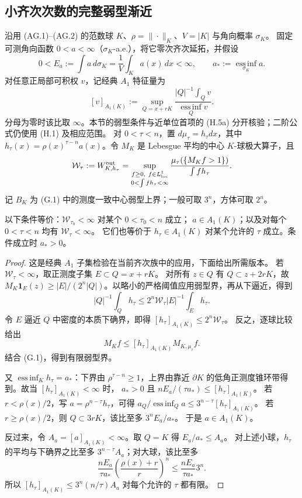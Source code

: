 \subsection{小齐次次数的完整弱型渐近}\label{subsec:small-homogeneity-weak}

沿用 (AG.1)--(AG.2) 的范数球 $K$、$\rho=\|\cdot\|_K$、$V=|K|$ 与角向概率 $\sigma_K$。
固定可测角向函数 $0<a<\infty$（$\sigma_K$-a.e.），将它零次齐次延拓，并假设
\[
0<E_a:=\int a\,d\sigma_K=\frac1V\int_Ka(x)\,dx<\infty,
\qquad a_*:=\operatorname*{ess\,inf}_{\sigma_K}a.
\]
对任意正局部可积权 $v$，记经典 $A_1$ 特征量\cite{Muckenhoupt1972}为
\[
[v]_{A_1(K)}:=\sup_{Q=x+rK}
\frac{|Q|^{-1}\int_Qv}{\operatorname*{ess\,inf}_Qv}. \tag{SA.1}
\]
分母为零时该比取 $\infty$。本节的弱型条件与近单位首项的 (H.5a) 分开核验；二阶公式仍使用 (H.1) 及相应范围。
对 $0<\tau<n$，置 $d\mu_\tau=h_\tau dx$，其中
$h_\tau(x)=\rho(x)^{\tau-n}a(x)$。令 $M_K$ 是 Lebesgue 平均的中心 $K$-球极大算子，且
\[
\mathcal W_\tau:=W^{\rm out}_{K,h_\tau}=\sup_{\substack{f\ge0,\ f\in L^1_{\rm loc}\\0<\int f h_\tau<\infty}}
\frac{\mu_\tau(\{M_Kf>1\})}{\int f h_\tau}.
\]
记 $B_K$ 为 (G.1) 中的测度一致中心弱型上界；一般可取 $3^n$，方体可取 $2^n$。


\begin{proposition}[齐次权的有限性判别]\label{prop:angular-a1-classification}
以下条件等价：$\mathcal W_{\tau_0}<\infty$ 对某个 $0<\tau_0<n$ 成立；
$a\in A_1(K)$；以及对每个 $0<\tau<n$ 均有 $\mathcal W_\tau<\infty$。
它们也等价于 $h_\tau\in A_1(K)$ 对某个允许的 $\tau$ 成立。条件成立时 $a_*>0$。
\end{proposition}
\begin{proof}
这是经典 $A_1$ 子集检验在当前齐次族中的应用，下面给出所需版本。
若 $\mathcal W_\tau<\infty$，取正测度子集 $E\subset Q=x+rK$。
对所有 $z\in Q$ 有 $Q\subset z+2rK$，故
$M_K\mathbf1_E(z)\ge |E|/(2^n|Q|)$。以略小的严格阈值应用弱型界，再从下逼近，得到
\[
|Q|^{-1}\int_Qh_\tau\le2^n\mathcal W_\tau |E|^{-1}\int_Eh_\tau.
\]
令 $E$ 逼近 $Q$ 中密度的本质下确界，即得
$[h_\tau]_{A_1(K)}\le2^n\mathcal W_\tau$。
反之，逐球比较给出
\[M_Kf\le[h_\tau]_{A_1(K)}M_{K,\mu_\tau}f.\]
结合 (G.1)，得到有限弱型界。

又 $\operatorname*{ess\,inf}_Kh_\tau=a_*$：下界由 $\rho^{\tau-n}\ge1$，上界由靠近
$\partial K$ 的低角正测度锥环带得到。故当 $[h_\tau]_{A_1(K)}<\infty$ 时，
$a_*>0$ 且 $nE_a/(\tau a_*)\le[h_\tau]_{A_1(K)}$。
若 $r<\rho(x)/2$，写 $a=\rho^{n-\tau}h_\tau$，可得
$a_Q/\operatorname*{ess\,inf}_Qa\le3^{n-\tau}[h_\tau]_{A_1(K)}$。
若 $r\ge\rho(x)/2$，则 $Q\subset3rK$，该比至多 $3^nE_a/a_*$。
于是 $a\in A_1(K)$。

反过来，令 $A_a=[a]_{A_1(K)}<\infty$。取 $Q=K$ 得 $E_a/a_*\le A_a$。
对上述小球，$h_\tau$ 的平均与下确界之比至多 $3^{n-\tau}A_a$；对大球，该比至多
\[
\frac{nE_a}{\tau a_*}\left(\frac{\rho(x)+r}{r}\right)^n
\le\frac{nE_a}{\tau a_*}3^n.
\]
所以 $[h_\tau]_{A_1(K)}\le3^n(n/\tau)A_a$ 对每个允许的 $\tau$ 都有限。
\end{proof}

